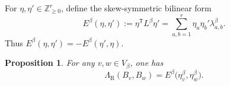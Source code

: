 \documentclass[12pt, reqno]{amsart}
\theoremstyle{plain}
\newtheorem{proposition}[theorem]{Proposition}
\theoremstyle{definition}
\numberwithin{equation}{section}
\newcommand{\ZZ}{\mathbb{Z}}
\newcommand{\LambdaR}{\Lambda_{\mathrm R}}
\begin{document}
For \(\eta,\eta'\in\ZZ_{\geq0}^r\), define the skew-symmetric
bilinear form
\begin{equation}\label{eq:E-beta-definition}
    E^\beta(\eta,\eta')
    :=
    \eta^{\mathsf T}L^\beta\eta'
    =
    \sum_{a,b=1}^r
    \eta_a\eta_b'\lambda_{a,b}^\beta.
\end{equation}
Thus
\(E^\beta(\eta,\eta')=-E^\beta(\eta',\eta)\).

\begin{proposition}\label{pro:LambdaBv}
For any \(v,w\in V_\beta\), one has
\begin{equation}\label{eq:Lambda-Bv-Bw-E-beta}
    \LambdaR(B_v,B_w)
    =
    E^\beta\bigl(
        \eta_v^\beta,
        \eta_w^\beta
    \bigr).
\end{equation}
\end{proposition}
\end{document}
